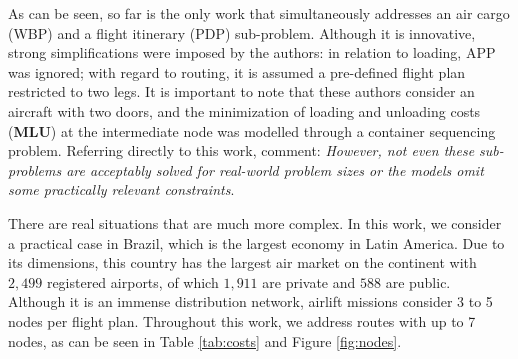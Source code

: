 \documentclass[preprint,authoryear]{elsarticle}
\begin{document}
As can be seen, so far \cite{LurkinSchyns2015} is the only work that simultaneously addresses an air cargo (WBP) and a flight itinerary (PDP) sub-problem. Although it is innovative, strong simplifications were imposed by the authors: in relation to loading, APP was ignored; with regard to routing, it is assumed a pre-defined flight plan restricted to two legs. It is important to note that these authors consider an aircraft with two doors, and the minimization of loading and unloading costs ({\bf MLU}) at the intermediate node was modelled through a container sequencing problem. Referring directly to this work, \cite[p. 409]{BrandtStefan2019} comment: {\it However, not even these sub-problems are acceptably solved for real-world problem sizes or the models omit some practically relevant constraints}. 

There are real situations that are much more complex. In this work, we consider a practical case in Brazil, which is the largest economy in Latin America. Due to its dimensions, this country has the largest air market on the continent with $2,499$\/ registered airports, of which $1,911$\/ are private and $588$\/ are public. Although it is an immense distribution network, airlift missions consider 3 to 5 nodes per flight plan. Throughout this work, we address routes with up to 7 nodes, as can be seen in Table \ref{tab:costs} and Figure \ref{fig:nodes}.
\end{document}
